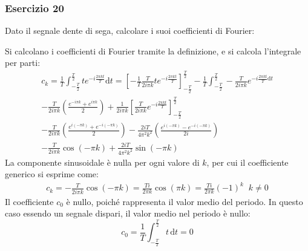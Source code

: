 \documentclass{article}
\newcommand{\df}{\mathrm{d}}
\begin{document}
\subsubsection*{Esercizio 20}

Dato il segnale dente di sega, calcolare i suoi coefficienti di Fourier:
\begin{center}
\end{center}

Si calcolano i coefficienti di Fourier tramite la definizione, e si calcola l'integrale per parti: 
\begin{gather*}
    c_k=\displaystyle\frac{1}{T}\int_{-\frac{T}{2}}^{\frac{T}{2}}te^{-i\frac{2\pi kt}{T}}\df t=\displaystyle\left[-\frac{1}{T}\frac{T}{2i\pi k}te^{-i\frac{2\pi kt}{T}}\right]_{-\frac{T}{2}}^{\frac{T}{2}}-
    \frac{1}{T}\int_{-\frac{T}{2}}^{\frac{T}{2}}-\frac{T}{2i\pi k}e^{-i\frac{2\pi kt}{T}\df t}\\
    \displaystyle-\frac{T}{2i\pi k}\left(\frac{e^{-i\pi k}+e^{i\pi k}}{2}\right)+\frac{1}{2i\pi k}\left[\frac{T}{2i\pi k}e^{-i\frac{2\pi kt}{T}}\right]_{-\frac{T}{2}}^{\frac{T}{2}}\\
    \displaystyle-\frac{T}{2i\pi k}\left(\frac{e^{i(-\pi k)}+e^{-i(-\pi k)}}{2}\right)-\frac{2iT}{4\pi^2k^2}\left(\frac{e^{i(-\pi k)}-e^{-i(-\pi k)}}{2i}\right)\\
    \displaystyle-\frac{T}{2i\pi k}\cos\left(-\pi k\right)+\frac{2iT}{4\pi^2k^2}\sin(-\pi k)
\end{gather*}
La componente sinusoidale è nulla per ogni valore di $k$, per cui il coefficiente generico si esprime come:
\begin{gather}
    c_k=\displaystyle-\frac{T}{2i\pi k}\cos(-\pi k)=\frac{Ti}{2\pi k}\cos(\pi k)=\frac{Ti}{2\pi k}(-1)^k \;\;k\neq0
\end{gather}
Il coefficiente $c_0$ è nullo, poiché rappresenta il valor medio del periodo. In questo caso essendo un segnale dispari, il valor medio nel periodo è nullo:
\begin{equation}
    c_0=\displaystyle\frac{1}{T}\int_{-\frac{T}{2}}^{\frac{T}{2}}t\,\df t=0
\end{equation}
\end{document}
